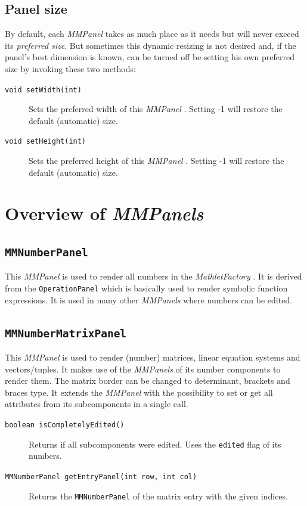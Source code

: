 \documentclass[a4paper,12pt]{book}
\newcommand{\appfac}{\emph{MathletFactory }}
\newcommand{\mmp}{\emph{MMPanel }}
\newcommand{\mmps}{\emph{MMPanels }}
\begin{document}
    \subsection{Panel size}
    By default, each \mmp takes as much place as it needs but will never exceed its \textit{preferred size}.
    But sometimes this dynamic resizing is not desired and, if the panel's best dimension is known, can be turned
    off be setting his own preferred size by invoking these two methods:
    \begin{description}
      \item[{\tt void setWidth(int)}]
      Sets the preferred width of this \mmp. Setting -1 will restore the default (automatic) size.
      \item[{\tt void setHeight(int)}] 
      Sets the preferred height of this \mmp. Setting -1 will restore the default (automatic) size.
    \end{description}
    
  \section{Overview of \mmps}
    \subsection{{\tt MMNumberPanel}}
    This \mmp is used to render all numbers in the \appfac. It is derived from the {\tt OperationPanel} which is
    basically used to render symbolic function expressions. It is used in many other \mmps where numbers
    can be edited.
    
    \subsection{{\tt MMNumberMatrixPanel}}
    This \mmp is used to render (number) matrices, linear equation systems and vectors/tuples. 
    It makes use of the \mmps of its number components to render them. The matrix border can be changed 
    to determinant, brackets and braces type.
    It extends the \mmp with the possibility to set or get all attributes from its subcomponents in a single call.
    \begin{description}
      \item[{\tt boolean isCompletelyEdited()}]
      Returns if all subcomponents were edited. Uses the {\tt edited} flag of its numbers.
      \item[{\tt MMNumberPanel getEntryPanel(int row, int col)}] 
      Returns the {\tt MMNumberPanel} of the matrix entry with the given indices.
    \end{description}
\end{document}
